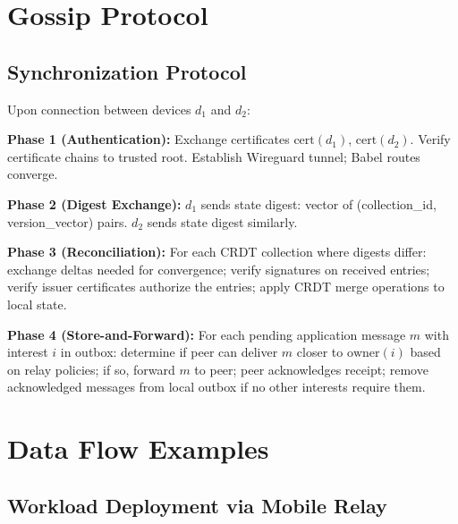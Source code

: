 \section{Gossip Protocol}

\subsection{Synchronization Protocol}

Upon connection between devices $d_1$ and $d_2$:

\textbf{Phase 1 (Authentication):} Exchange certificates $\text{cert}(d_1)$, $\text{cert}(d_2)$. Verify certificate chains to trusted root. Establish Wireguard tunnel; Babel routes converge.

\textbf{Phase 2 (Digest Exchange):} $d_1$ sends state digest: vector of (collection\_id, version\_vector) pairs. $d_2$ sends state digest similarly.

\textbf{Phase 3 (Reconciliation):} For each CRDT collection where digests differ: exchange deltas needed for convergence; verify signatures on received entries; verify issuer certificates authorize the entries; apply CRDT merge operations to local state.

\textbf{Phase 4 (Store-and-Forward):} For each pending application message $m$ with interest $i$ in outbox: determine if peer can deliver $m$ closer to $\text{owner}(i)$ based on relay policies; if so, forward $m$ to peer; peer acknowledges receipt; remove acknowledged messages from local outbox if no other interests require them.

\section{Data Flow Examples}

\subsection{Workload Deployment via Mobile Relay}

